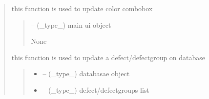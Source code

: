 \documentclass[letterpaper,10pt,english]{sphinxmanual}
\begin{document}
\begin{quote}
\begin{savenotes}\begin{fulllineitems}
\label{\detokenize{setting/backend/defect_management_funcs:oxin.backend.defect_management_funcs.update_combo_color}}
\pysigstartsignatures
{}
\pysigstopsignatures
\sphinxAtStartPar
this function is used to update color combobox
\begin{quote}\begin{description}
\sphinxAtStartPar
{} – (\_type\_) main ui object

\sphinxAtStartPar
None

\end{description}\end{quote}

\end{fulllineitems}\end{savenotes}


\begin{savenotes}\begin{fulllineitems}
\label{\detokenize{setting/backend/defect_management_funcs:oxin.backend.defect_management_funcs.update_defects_to_db}}
\pysigstartsignatures
{}
\pysigstopsignatures
\sphinxAtStartPar
this function is used to update a defect/defect\sphinxhyphen{}group on database
\begin{quote}\begin{description}
\begin{itemize}
\item {} 
\sphinxAtStartPar
{} – (\_type\_) databasae object

\item {} 
\sphinxAtStartPar
{} – (\_type\_) defect/defect\sphinxhyphen{}groups list


\end{itemize}
\end{description}
\end{quote}
\end{fulllineitems}
\end{savenotes}
\end{quote}
\end{document}
